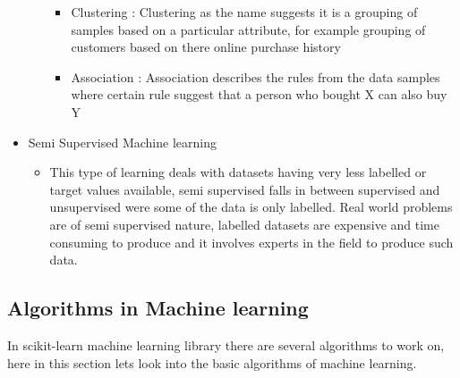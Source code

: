 \begin{itemize}
\begin{itemize}
         \begin{itemize}
             \item Clustering : Clustering as the name suggests it is a grouping of samples based on a particular attribute, for example grouping of customers based on there online purchase history
             \item Association : Association describes the rules from the data samples where certain rule suggest that a person who bought X can also buy Y
         \end{itemize}
     \end{itemize}
     
     \item Semi Supervised Machine learning
        \begin{itemize}
            \item This type of learning deals with datasets having very less labelled or target values available, semi supervised falls in between supervised and unsupervised were some of the data is only labelled. Real world problems are of semi supervised nature, labelled datasets are expensive and time consuming to produce and it involves experts in the field to produce such data.
        \end{itemize}
    
\end{itemize}

\subsection{Algorithms in Machine learning}
In scikit-learn\cite{scikit-learn} machine learning library there are several algorithms to work on, here in this section lets look into the basic algorithms of machine learning.

